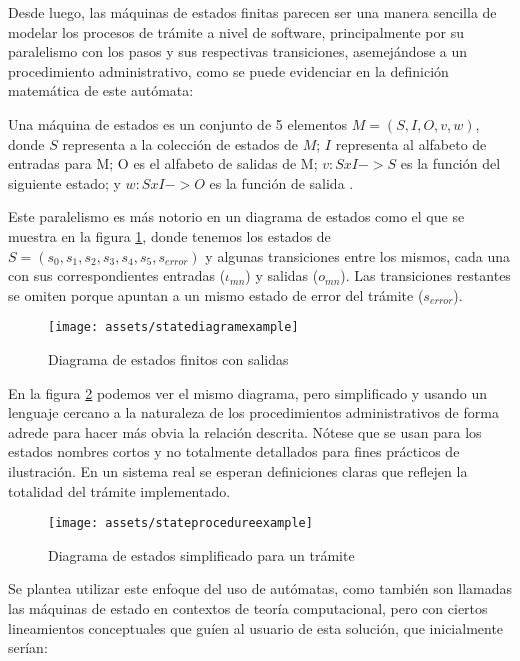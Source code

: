 Desde luego, las máquinas de estados finitas parecen ser una manera sencilla de
modelar los procesos de trámite a nivel de software, principalmente por su
paralelismo con los pasos y sus respectivas transiciones, asemejándose a un
procedimiento administrativo, como se puede evidenciar en la definición
matemática de este autómata:

\begin{definition}
    Una máquina de estados es un conjunto de 5 elementos $M=(S,I,O,v,w)$, donde
    $S$ representa a la colección de estados de $M$; $I$ representa al alfabeto
    de entradas para M; O es el alfabeto de salidas de M; $v:SxI->S$ es la
    función del siguiente estado; y $w:SxI->O$ es la función de salida
    \parencite{grimaldiDiscreteCombinatorialMathematics1998}.
\end{definition}

Este paralelismo es más notorio en un diagrama de estados como el que se muestra
en la figura \ref{fig:states}, donde tenemos los estados de $S = (s_{0}, s_{1},
    s_{2}, s_{3}, s_{4}, s_{5}, s_{error})$ y algunas transiciones entre los mismos,
cada una con sus correspondientes entradas ($\iota_{mn}$) y salidas ($o_{mn}$).
Las transiciones restantes se omiten porque apuntan a un mismo estado de error
del trámite ($s_{error}$).

\begin{figure}[ht]
    \centering
    \texttt{[image: assets/statediagramexample]}
    \caption{Diagrama de estados finitos con salidas}
    \label{fig:states}
\end{figure}

En la figura \ref{fig:states_procedure} podemos ver el mismo diagrama, pero
simplificado y usando un lenguaje cercano a la naturaleza de los procedimientos
administrativos de forma adrede para hacer más obvia la relación descrita.
Nótese que se usan para los estados nombres cortos y no totalmente detallados
para fines prácticos de ilustración. En un sistema real se esperan definiciones
claras que reflejen la totalidad del trámite implementado.

\begin{figure}[ht]
    \centering
    \texttt{[image: assets/stateprocedureexample]}
    \caption{Diagrama de estados simplificado para un trámite}
    \label{fig:states_procedure}
\end{figure}

Se plantea utilizar este enfoque del uso de autómatas, como también son llamadas
las máquinas de estado en contextos de teoría computacional, pero con ciertos
lineamientos conceptuales que guíen al usuario de esta solución, que
inicialmente serían:


